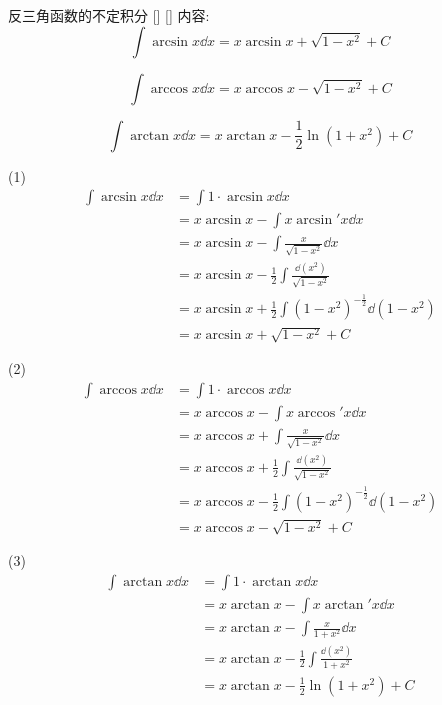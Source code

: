 \documentclass[UTF8]{ctexart}
\begin{document}
				\begin{xmp}
			    []
			    {反三角函数的不定积分}
			    []
			    []
					内容: 
					\[ \int \arcsin x \dd x = x \arcsin x + \sqrt{1 - x^2} + C \]
					
					\[ \int \arccos x \dd x = x \arccos x - \sqrt{1 - x^2} + C \]
	
					\[ \int \arctan x \dd x = x \arctan x - \frac{1}{2} \ln(1 + x^2) + C \]
				\end{xmp}
								
				\begin{prf}
					(1)
					\[\begin{aligned}
					\int \arcsin x \dd x 
					& = \int 1 \cdot \arcsin x \dd x \\
					& = x \arcsin x - \int x \arcsin' x \dd x \\
					& = x \arcsin x - \int \frac{x}{\sqrt{1 - x^2}} \dd x \\
					& = x \arcsin x - \frac{1}{2} \int \frac{\dd (x^2)}{\sqrt{1 - x^2}} \\
					& = x \arcsin x + \frac{1}{2} \int (1 - x^2)^{-\frac{1}{2}} \dd (1 - x^2) \\
					& = x \arcsin x + \sqrt{1 - x^2} + C
					\end{aligned}\]
					
					(2)
					\[\begin{aligned}
					\int \arccos x \dd x 
					& = \int 1 \cdot \arccos x \dd x \\
					& = x \arccos x - \int x \arccos' x \dd x \\
					& = x \arccos x + \int \frac{x}{\sqrt{1 - x^2}} \dd x \\
					& = x \arccos x + \frac{1}{2} \int \frac{\dd (x^2)}{\sqrt{1 - x^2}} \\
					& = x \arccos x - \frac{1}{2} \int (1 - x^2)^{-\frac{1}{2}} \dd (1 - x^2) \\
					& = x \arccos x - \sqrt{1 - x^2} + C
					\end{aligned}\]
					
					(3)
					\[\begin{aligned}
					\int \arctan x \dd x 
					& = \int 1 \cdot \arctan x \dd x \\
					& = x \arctan x - \int x \arctan' x \dd x \\
					& = x \arctan x - \int \frac{x}{1 + x^2} \dd x \\
					& = x \arctan x - \frac{1}{2} \int \frac{\dd (x^2)}{1 + x^2} \\
					& = x \arctan x - \frac{1}{2} \ln(1 + x^2) + C
					\end{aligned}\]
				\end{prf}
			
\end{document}
